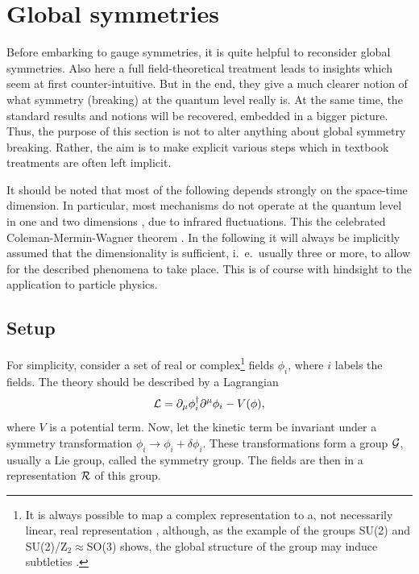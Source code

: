 \documentclass[final,twoside,12pt]{article}
\newcommand*{\La}{{\cal{L}}}
\newcommand*{\no}{\noindent}
\newcommand*{\be}{\begin{equation}}
\newcommand*{\ee}{\end{equation}}
\newcommand*{\pd}{\partial}
\newcommand*{\pdm}{\pd_{\mu}}
\newcommand*{\1}{1\!\!\!\bot}
\begin{document}
\section{Global symmetries}\label{s:global}

Before embarking to gauge symmetries, it is quite helpful to reconsider global symmetries. Also here a full field-theoretical treatment \cite{Strocchi:2015uaa} leads to insights which seem at first counter-intuitive. But in the end, they give a much clearer notion of what symmetry (breaking) at the quantum level really is. At the same time, the standard results and notions will be recovered, embedded in a bigger picture. Thus, the purpose of this section is not to alter anything about global symmetry breaking. Rather, the aim is to make explicit various steps which in textbook treatments are often left implicit.

It should be noted that most of the following depends strongly on the space-time dimension. In particular, most mechanisms do not operate at the quantum level in one and two dimensions \cite{Frohlich:1978px,Strocchi:2015uaa}, due to infrared fluctuations. This the celebrated Coleman-Mermin-Wagner theorem \cite{Strocchi:2015uaa,Mermin:1966fe,Coleman:1973ci}. In the following it will always be implicitly assumed that the dimensionality is sufficient, i.\ e.\ usually three or more, to allow for the described phenomena to take place. This is of course with hindsight to the application to particle physics.

\subsection{Setup}

For simplicity, consider a set of real or complex\footnote{It is always possible to map a complex representation to a, not necessarily linear, real representation \cite{Bohm:2001yx,O'Raifeartaigh:1978kv,Sartori:1992ib}, although, as the example of the groups SU(2) and SU(2)/Z$_2\approx$SO(3) shows, the global structure of the group may induce subtleties \cite{O'Raifeartaigh:1978kv,Heissenberg:2015tji}.} fields $\phi_i$, where $i$ labels the fields. The theory should be described by a Lagrangian
\be
\La=\pdm\phi^\dagger_i\pd^\mu\phi_i-V(\phi)\label{linsig},
\ee
\no where $V$ is a potential term. Now, let the kinetic term be invariant under a symmetry transformation $\phi_i\to\phi_i+\delta\phi_i$. These transformations form a group ${\cal G}$, usually a Lie group, called the symmetry group. The fields are then in a representation ${\cal R}$ of this group.
\end{document}
